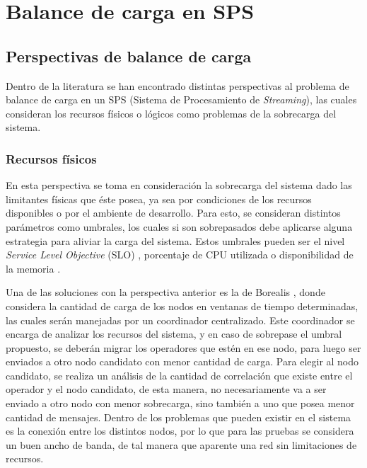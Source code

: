 \chapter{Balance de carga en SPS}
\label{cap:estadoDelArte}

\section{Perspectivas de balance de carga}
\label{sec:perspectivasBC}
Dentro de la literatura se han encontrado distintas perspectivas al problema de balance de carga en un SPS (Sistema de Procesamiento de \textsl{Streaming}), las cuales consideran los recursos físicos o lógicos como problemas de la sobrecarga del sistema.

\subsection{Recursos físicos}
\label{subsec:recFisicosBC}
En esta perspectiva se toma en consideración la sobrecarga del sistema dado las limitantes físicas que éste posea, ya sea por condiciones de los recursos disponibles o por el ambiente de desarrollo. Para esto, se consideran distintos parámetros como umbrales, los cuales si son sobrepasados debe aplicarse alguna estrategia para aliviar la carga del sistema. Estos umbrales pueden ser el nivel \textit{Service Level Objective} (SLO) \citep{sturm2000foundations}, porcentaje de CPU utilizada o disponibilidad de la memoria \citep{Dong06schedulingalgorithms}.

Una de las soluciones con la perspectiva anterior es la de Borealis \citep{XingZH05}, donde considera la cantidad de carga de los nodos en ventanas de tiempo determinadas, las cuales serán manejadas por un coordinador centralizado. Este coordinador se encarga de analizar los recursos del sistema, y en caso de sobrepase el umbral propuesto, se deberán migrar los operadores que estén en ese nodo, para luego ser enviados a otro nodo candidato con menor cantidad de carga. Para elegir al nodo candidato, se realiza un análisis de la cantidad de correlación que existe entre el operador y el nodo candidato, de esta manera, no necesariamente va a ser enviado a otro nodo con menor sobrecarga, sino también a uno que posea menor cantidad de mensajes. Dentro de los problemas que pueden existir en el sistema es la conexión entre los distintos nodos, por lo que para las pruebas se considera un buen ancho de banda, de tal manera que aparente una red sin limitaciones de recursos.

